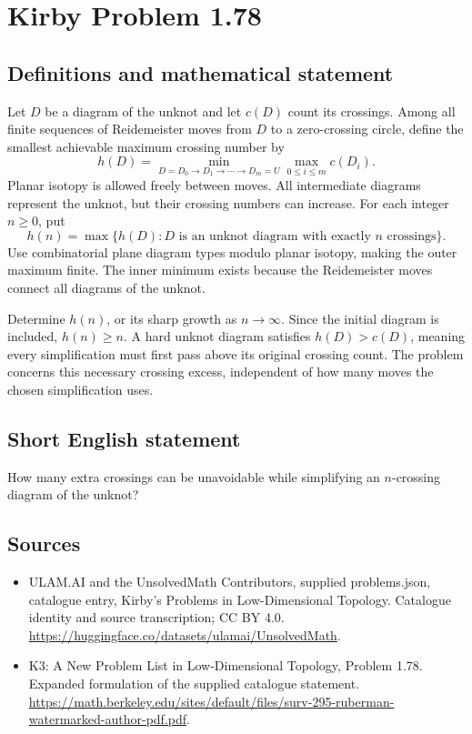 \documentclass[11pt,a4paper]{article}
\begin{document}
\section*{Kirby Problem 1.78}\label{statement}

\subsection{Definitions and mathematical statement}
Let $D$ be a diagram of the unknot and let $c(D)$ count its crossings.
Among all finite sequences of Reidemeister moves from $D$ to a zero-crossing
circle, define the smallest achievable maximum crossing number by
\[
h(D)=\min_{D=D_0\to D_1\to\cdots\to D_m=U}
          \max_{0\leq i\leq m}c(D_i).
\]
Planar isotopy is allowed freely between moves. All intermediate diagrams
represent the unknot, but their crossing numbers can increase.
For each integer $n\geq0$, put
\[
h(n)=\max\{h(D):D\text{ is an unknot diagram with exactly }n\text{ crossings}\}.
\]
Use combinatorial plane diagram types modulo planar isotopy, making the outer
maximum finite. The inner minimum exists because the Reidemeister moves connect
all diagrams of the unknot.

Determine $h(n)$, or its sharp growth as $n\to\infty$. Since the initial diagram
is included, $h(n)\geq n$. A hard unknot diagram satisfies $h(D)>c(D)$, meaning
every simplification must first pass above its original crossing count. The
problem concerns this necessary crossing excess, independent of how many moves
the chosen simplification uses.
\subsection{Short English statement}
How many extra crossings can be unavoidable while simplifying an $n$-crossing diagram of the unknot?
\subsection{Sources}
\begin{itemize}
\item[S1] ULAM.AI and the UnsolvedMath Contributors, supplied problems.json, catalogue entry, Kirby's Problems in Low-Dimensional Topology. Catalogue identity and source transcription; CC BY 4.0.
\url{https://huggingface.co/datasets/ulamai/UnsolvedMath}.
\item[S2] K3: A New Problem List in Low-Dimensional Topology, Problem 1.78. Expanded formulation of the supplied catalogue statement.
\url{https://math.berkeley.edu/sites/default/files/surv-295-ruberman-watermarked-author-pdf.pdf}.
\end{itemize}
\end{document}
